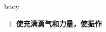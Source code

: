 
\begin{frame}
{\huge buoy}
\begin{center}
\begin{enumerate}\Large
  \item \textbf{使充满勇气和力量，使振作}
\end{enumerate}
\end{center}
\end{frame}
